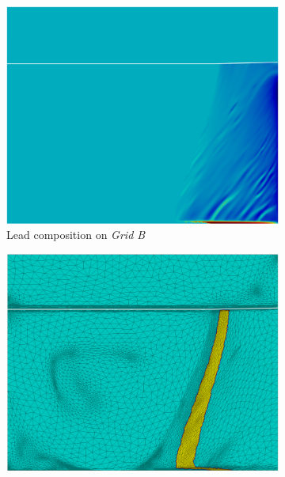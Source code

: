 \begin{figure}[H]
\begin{subfigure}[t]{0.15\textwidth}
  \end{subfigure}
  \begin{subfigure}[t]{0.4\textwidth}
    \centering
  \includegraphics[width=\textwidth]{Chapter5/Graphics/2d/processed/1200s_compobis.png}
  \caption{Lead composition on \emph{Grid B}}
    \label{fig:1200s_compobis}
  \end{subfigure}
   \vspace{5mm}
  \begin{subfigure}[t]{0.4\textwidth}
    \centering
  \includegraphics[width=\textwidth]{Chapter5/Graphics/2d/processed/1200s_unmask.png}

\end{subfigure}
\end{figure}
